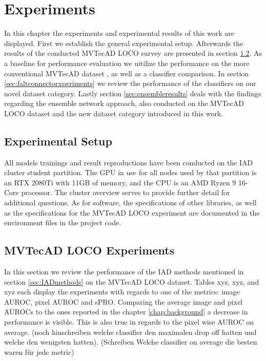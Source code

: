 \chapter{Experiments}
\label{chap:experiments}

In this chapter the experiments and experimental results of this work are displayed. First we establish the general experimental setup. Afterwards the results of the conducted MVTecAD LOCO \cite{LOCODentsAndScratchesBergmann2022}
survey are presented in section \ref{sec:locoxperiments}. As a baseline for performance evaluation we uitilize the performance on the more conventional MVTecAD dataset \cite{MVTEC_Bergmann_2021}, 
as well as a classifier comparison. In section \ref{sec:faltconnectorxperiments} we review the performance of the classifiers on our novel dataset category. Lastly section \ref{sec:ensembleresults} 
deals with the findings regarding the ensemble network approach, also conducted on the MVTecAD LOCO dataset and the new dataset category introduced in this work.


\section{Experimental Setup}
\label{sec:experimentsetup}

All models trainings and result reproductions have been conducted on the IAD cluster student partition. The GPU in use for all nodes used by that partition is an 
RTX 2080Ti with 11GB of memory, and the CPU is an AMD Ryzen 9 16-Core processor. The cluster overview \cite{clusterdocs} serves to provide further detail for additional questions. 
As for software, the specifications of other libraries, as well as the specifications for the MVTecAD LOCO experiment are documented in the 
environment files in the project code.



\section{MVTecAD LOCO Experiments}
\label{sec:locoxperiments}

In this section we review the performance of the IAD methods mentioned in section \ref{sec:IADmethods} on the MVTecAD LOCO \cite{LOCODentsAndScratchesBergmann2022} 
dataset. Tables xyz, xyz, and xyz each display the experiments with regards to one of the metrics: image AUROC, pixel AUROC and sPRO. \newline
Comparing the average image and pixel AUROCs to the ones reported in the chapter \ref{chap:background} a decrease in performance is visible. 
This is also true in regards to the pixel wise AUROC on average. (noch hinschreiben welche classifier den maximalen drop off hatten und 
welche den wenigsten hatten). (Schreiben Welche classifier on average die besten waren für jede metric)

